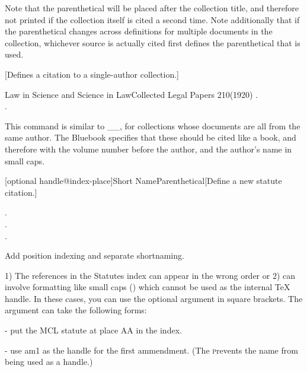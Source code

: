  Note that the parenthetical will be placed after the collection title, and therefore not printed if the collection itself is cited a second time. Note additionally
 that if the parenthetical changes across definitions for multiple documents in the collection, whichever source is actually cited first defines the parenthetical that is used.
 

[Defines a citation to a single-author collection.]

 \begin{Example}
     {Law in Science and Science in Law}{Collected Legal Papers}
     {210}{(1920)}
   . \\
   . 
 \end{Example}

 \noindent This command is similar to _\newincollection_, for collections whose documents are all from the same author. The Bluebook specifies that these should
 be cited like a book, and therefore with the volume number before the author, and the author's name in small caps.


[optional handle@index-place]{Short Name}{Parenthetical}[Define a new statute citation.]
 \begin{Example}
   . \\
   . \\
   .
 \end{Example}


 Add position indexing and separate shortnaming.

1) The references in the Statutes index can appear in the wrong order or
 2) can involve formatting like small caps (\textsc) which cannot be used as
 the internal TeX handle. In these cases, you can use the optional
 argument in square brackets. The argument can take the
 following forms:

  - put the MCL statute at place AA in the index.

  - use am1 as the handle
 for the first ammendment. (The \textsc prevents the name from being used
 as a handle.)

